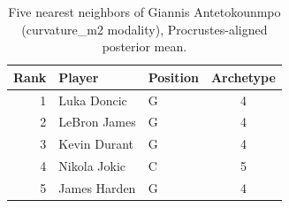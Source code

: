 \begin{table}[htbp]
  \centering\small
  \begin{tabular}{rllc}
    \toprule
    Rank & Player & Position & Archetype \\
    \midrule
    1 & Luka Doncic & G & 4 \\
    2 & LeBron James & G & 4 \\
    3 & Kevin Durant & G & 4 \\
    4 & Nikola Jokic & C & 5 \\
    5 & James Harden & G & 4 \\
    \bottomrule
  \end{tabular}
  \caption{Five nearest neighbors of Giannis Antetokounmpo (curvature_m2 modality), Procrustes-aligned posterior mean.}
  \label{tab:Giannis_Antetokounmpo_neighbors_curvature_m2}
\end{table}

